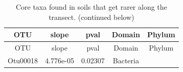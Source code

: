 \documentclass[]{article}
\begin{document}
\begin{longtable}[]{@{}ccccc@{}}
\caption{Core taxa found in soils that get rarer along the transect.
(continued below)}\tabularnewline
\toprule
\begin{minipage}[b]{0.13\columnwidth}\centering\strut
OTU\strut
\end{minipage} & \begin{minipage}[b]{0.14\columnwidth}\centering\strut
slope\strut
\end{minipage} & \begin{minipage}[b]{0.13\columnwidth}\centering\strut
pval\strut
\end{minipage} & \begin{minipage}[b]{0.13\columnwidth}\centering\strut
Domain\strut
\end{minipage} & \begin{minipage}[b]{0.27\columnwidth}\centering\strut
Phylum\strut
\end{minipage}\tabularnewline
\midrule
\endfirsthead
\toprule
\begin{minipage}[b]{0.13\columnwidth}\centering\strut
OTU\strut
\end{minipage} & \begin{minipage}[b]{0.14\columnwidth}\centering\strut
slope\strut
\end{minipage} & \begin{minipage}[b]{0.13\columnwidth}\centering\strut
pval\strut
\end{minipage} & \begin{minipage}[b]{0.13\columnwidth}\centering\strut
Domain\strut
\end{minipage} & \begin{minipage}[b]{0.27\columnwidth}\centering\strut
Phylum\strut
\end{minipage}\tabularnewline
\midrule
\endhead
\begin{minipage}[t]{0.13\columnwidth}\centering\strut
Otu00018\strut
\end{minipage} & \begin{minipage}[t]{0.14\columnwidth}\centering\strut
4.776e-05\strut
\end{minipage} & \begin{minipage}[t]{0.13\columnwidth}\centering\strut
0.02307\strut
\end{minipage} & \begin{minipage}[t]{0.13\columnwidth}\centering\strut
Bacteria\strut
\end{minipage} & \begin{minipage}[t]{0.27\columnwidth}\centering\strut

\end{minipage}
\end{longtable}
\end{document}
